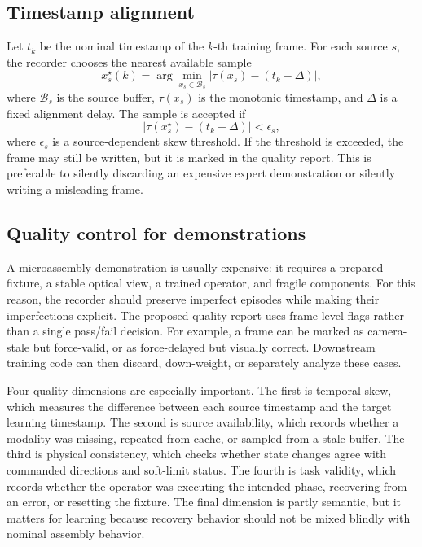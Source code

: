 \documentclass[10pt,twocolumn,letterpaper]{article}
\begin{document}
\subsection{Timestamp alignment}
Let $t_k$ be the nominal timestamp of the $k$-th training frame. For
each source $s$, the recorder chooses the nearest available sample
\begin{equation}
x_s^\star(k) = \arg\min_{x_s \in \mathcal{B}_s}
\left| \tau(x_s) - (t_k-\Delta) \right|,
\end{equation}
where $\mathcal{B}_s$ is the source buffer, $\tau(x_s)$ is the monotonic
timestamp, and $\Delta$ is a fixed alignment delay. The sample is accepted
if
\begin{equation}
\left| \tau(x_s^\star) - (t_k-\Delta) \right| < \epsilon_s,
\end{equation}
where $\epsilon_s$ is a source-dependent skew threshold. If the threshold
is exceeded, the frame may still be written, but it is marked in the
quality report. This is preferable to silently discarding an expensive
expert demonstration or silently writing a misleading frame.

\subsection{Quality control for demonstrations}
A microassembly demonstration is usually expensive: it requires a
prepared fixture, a stable optical view, a trained operator, and fragile
components. For this reason, the recorder should preserve imperfect
episodes while making their imperfections explicit. The proposed quality
report uses frame-level flags rather than a single pass/fail decision.
For example, a frame can be marked as camera-stale but force-valid, or
as force-delayed but visually correct. Downstream training code can then
discard, down-weight, or separately analyze these cases.

Four quality dimensions are especially important. The first is temporal
skew, which measures the difference between each source timestamp and
the target learning timestamp. The second is source availability, which
records whether a modality was missing, repeated from cache, or sampled
from a stale buffer. The third is physical consistency, which checks
whether state changes agree with commanded directions and soft-limit
status. The fourth is task validity, which records whether the operator
was executing the intended phase, recovering from an error, or resetting
the fixture. The final dimension is partly semantic, but it matters for
learning because recovery behavior should not be mixed blindly with
nominal assembly behavior.
\end{document}
